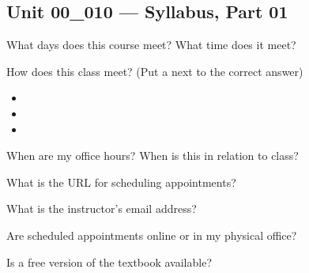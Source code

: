 \documentclass[letterpaper,12pt]{exam}
\newcommand{\unit}{Unit 00}
\begin{document}
\begin{questions}

\section*{\unit\_010 --- Syllabus, Part 01} %

\begin{samepage}
	\question What days does this course meet?  What time does it meet?
	\vspace{5mm}
\end{samepage}

\begin{samepage}
	\question How does this class meet? (Put a \checkmark next to the correct answer)
	  \begin{itemize}
		\item {}
		\vspace{5mm}
		\item {}
		\vspace{5mm}
		\item {}
		\vspace{5mm}
	   \end{itemize}
\end{samepage}

\begin{samepage}
	\question When are my office hours?  When is this in relation to class?
	\vspace{5mm}
\end{samepage}

\begin{samepage}
	\question What is the URL for scheduling appointments?
	\vspace{5mm}
\end{samepage}

\begin{samepage}
	\question What is the instructor's email address?
	\vspace{5mm}
\end{samepage}


\begin{samepage}
	\question Are scheduled appointments online or in my physical office?
	\vspace{5mm}
\end{samepage}

\begin{samepage}
	\question Is a free version of the textbook available?
	\vspace{5mm}
\end{samepage}


\end{questions}
\end{document}
